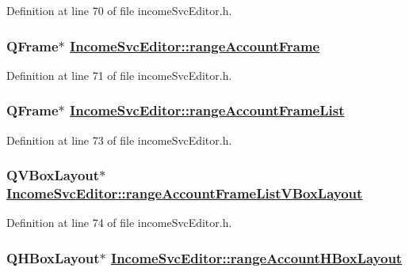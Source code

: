 Definition at line 70 of file income\-Svc\-Editor.h.\hypertarget{classIncomeSvcEditor_r14}{
\subsubsection[rangeAccountFrame]{\setlength{\rightskip}{0pt plus 5cm}QFrame$\ast$ \hyperlink{classIncomeSvcEditor_r14}{Income\-Svc\-Editor::range\-Account\-Frame}}}
\label{classIncomeSvcEditor_r14}


Definition at line 71 of file income\-Svc\-Editor.h.\hypertarget{classIncomeSvcEditor_r16}{
\subsubsection[rangeAccountFrameList]{\setlength{\rightskip}{0pt plus 5cm}QFrame$\ast$ \hyperlink{classIncomeSvcEditor_r16}{Income\-Svc\-Editor::range\-Account\-Frame\-List}}}
\label{classIncomeSvcEditor_r16}


Definition at line 73 of file income\-Svc\-Editor.h.\hypertarget{classIncomeSvcEditor_r17}{
\subsubsection[rangeAccountFrameListVBoxLayout]{\setlength{\rightskip}{0pt plus 5cm}QVBox\-Layout$\ast$ \hyperlink{classIncomeSvcEditor_r17}{Income\-Svc\-Editor::range\-Account\-Frame\-List\-VBox\-Layout}}}
\label{classIncomeSvcEditor_r17}


Definition at line 74 of file income\-Svc\-Editor.h.\hypertarget{classIncomeSvcEditor_r15}{
\subsubsection[rangeAccountHBoxLayout]{\setlength{\rightskip}{0pt plus 5cm}QHBox\-Layout$\ast$ \hyperlink{classIncomeSvcEditor_r15}{Income\-Svc\-Editor::range\-Account\-HBox\-Layout}}}
\label{classIncomeSvcEditor_r15}


